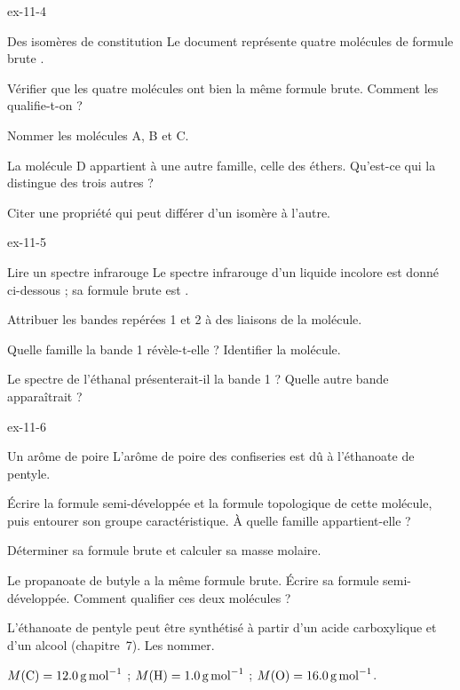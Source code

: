 \begin{blocLivre}{ex-11-4}
\begin{exercice}[1]{Des isomères de constitution}
Le document représente quatre molécules de formule brute .
\begin{questions}
\item Vérifier que les quatre molécules ont bien la même formule brute. Comment les qualifie-t-on ?
\item Nommer les molécules A, B et C.
\item La molécule D appartient à une autre famille, celle des éthers. Qu'est-ce qui la distingue des trois autres ?
\item Citer une propriété qui peut différer d'un isomère à l'autre.
\end{questions}
\end{exercice}
\end{blocLivre}
\begin{blocLivre}{ex-11-5}
\begin{exercice}[1]{Lire un spectre infrarouge}
Le spectre infrarouge d'un liquide incolore est donné ci-dessous ; sa formule brute est .
\begin{questions}
\item Attribuer les bandes repérées 1 et 2 à des liaisons de la molécule.
\item Quelle famille la bande 1 révèle-t-elle ? Identifier la molécule.
\item Le spectre de l'éthanal  présenterait-il la bande 1 ? Quelle autre bande apparaîtrait ?
\end{questions}
\end{exercice}
\end{blocLivre}
\begin{blocLivre}{ex-11-6}
\begin{exercice}[2]{Un arôme de poire}
L'arôme de poire des confiseries est dû à l'éthanoate de pentyle.
\begin{questions}
\item Écrire la formule semi-développée et la formule topologique de cette molécule, puis entourer son groupe
caractéristique. À quelle famille appartient-elle ?
\item Déterminer sa formule brute et calculer sa masse molaire.
\item Le propanoate de butyle a la même formule brute. Écrire sa formule semi-développée. Comment qualifier ces deux
molécules ?
\item L'éthanoate de pentyle peut être synthétisé à partir d'un acide carboxylique et d'un alcool (chapitre~7). Les
nommer.
\end{questions}
\begin{donnees}
$M(\ce{C})=\qty{12,0}{g.mol^{-1}}$ ; $M(\ce{H})=\qty{1,0}{g.mol^{-1}}$ ; $M(\ce{O})=\qty{16,0}{g.mol^{-1}}$.
\end{donnees}
\end{exercice}
\end{blocLivre}
